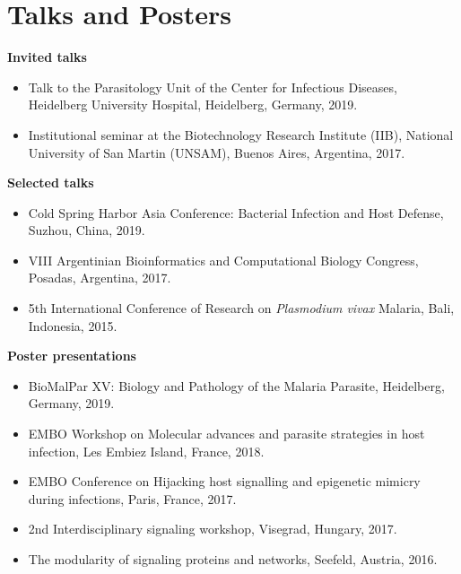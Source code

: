 \documentclass[11pt,a4paper,sans]{moderncv} %
\begin{document}
\vspace{0.5cm}

\section{Talks and Posters}
\vspace{-.1cm}
\textbf{Invited talks}
\begin{itemize}
  \item Talk to the Parasitology Unit of the Center for Infectious Diseases, Heidelberg University Hospital, Heidelberg, Germany, 2019.
  \item Institutional seminar at the Biotechnology Research Institute (IIB), National University of San Martin (UNSAM), Buenos Aires, Argentina, 2017.
\end{itemize}
\vspace{.1cm}
\textbf{Selected talks}
\begin{itemize}
  \item Cold Spring Harbor Asia Conference: Bacterial Infection and Host Defense, Suzhou, China, 2019.
  \item VIII Argentinian Bioinformatics and Computational Biology Congress, Posadas, Argentina, 2017.
  \item 5th International Conference of Research on \textit{Plasmodium vivax} Malaria, Bali, Indonesia, 2015.
\end{itemize}
\vspace{.1cm}
\textbf{Poster presentations}
\begin{itemize}
  \item BioMalPar XV: Biology and Pathology of the Malaria Parasite, Heidelberg, Germany, 2019.
  \item EMBO Workshop on Molecular advances and parasite strategies in host infection, Les Embiez Island, France, 2018.
  \item EMBO Conference on Hijacking host signalling and epigenetic mimicry during infections, Paris, France, 2017.
  \item 2nd Interdisciplinary signaling workshop, Visegrad, Hungary, 2017.
  \item The modularity of signaling proteins and networks, Seefeld, Austria, 2016.\\
\end{itemize}

\pagebreak
\end{document}
